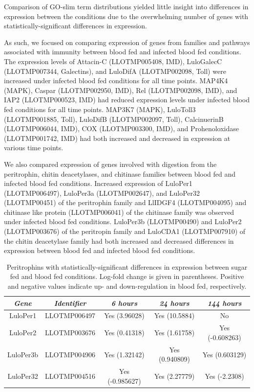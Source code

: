 Comparison of GO-slim term distributions yielded little insight into differences in expression between the conditions due to the overwhelming number of genes with statistically-significant differences in expression.

As such, we focused on comparing expression of genes from families and pathways associated with immunity between blood fed and infected blood fed conditions.  The expression levels of Attacin-C (LLOTMP005408, IMD), LuloGalecC (LLOTMP007344, Galectins), and LuloDifA (LLOTMP002098, Toll) were increased under infected blood fed conditions for all time points.  MAP4K4 (MAPK), Caspar (LLOTMP002950, IMD), Rel (LLOTMP002098, IMD), and IAP2 (LLOTMP000523, IMD) had reduced expression levels under infected blood fed conditions for all time points.  MAP3K7 (MAPK), LuloToll3 (LLOTMP001885, Toll), LuloDifB (LLOTMP002097, Toll), CalcinuerinB (LLOTMP006044, IMD), COX (LLOTMP003300, IMD), and Prohenoloxidase (LLOTMP001742, IMD) had both increased and decreased in expression at various time points.

We also compared expression of genes involved with digestion from the peritrophin, chitin deacetylases, and chitinase families between blood fed and infected blood fed conditions. Increased expression of LuloPer1 (LLOTMP006497), LuloPer3a (LLOTMP002647), and LuloPer32 (LLOTMP00451) of the peritrophin family and LlIDGF4 (LLOTMP004095) and chitinase like protein (LLOTMP006041) of the chitinase family was observed under infected blood fed conditions.  LuloPer3b (LLOTMP00490) and LuloPer2 (LLOTMP003676) of the peritropin family and LuloCDA1 (LLOTMP007910) of the chitin deacetylase family had both increased and decreased differences in expression between blood fed and infected blood fed conditions.

\begin{table}[H]
  \centering
  \begin{tabular}{ c c c c c } \hline
    \emph{Gene} & \emph{Identifier} & \emph{6 hours} & \emph{24 hours} & \emph{144 hours} \\ \hline
    LuloPer1 & LLOTMP006497 & Yes (3.96028) & Yes (10.5884) & No \\
    LuloPer2 & LLOTMP003676 & Yes (0.41318) & Yes (1.61758) & Yes (-0.608263) \\
    LuloPer3b & LLOTMP004906 & Yes (1.32142) & Yes (0.940809) & Yes (0.603129) \\
    LuloPer32 & LLOTMP004516 & Yes (-0.985627) & Yes (2.27779) & Yes (-2.2308)
  \end{tabular}
  \caption{Peritrophins with statistically-significant differences in expression between sugar fed and blood fed conditions. Log-fold change is given in parentheses. Positive and negative values indicate up- and down-regulation in blood fed, respectively.}
  \label{tab:sandflies:stat-sig-peritrophins-sb}
\end{table}

